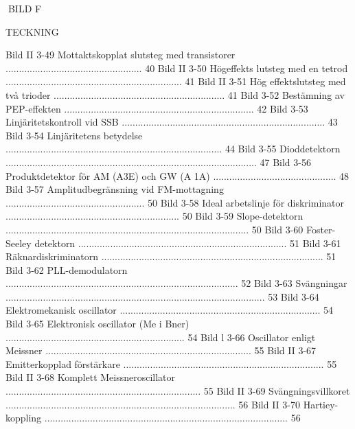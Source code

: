 \documentclass[a4paper,twoside,twocolumn,openright]{book}
\begin{document}
{{{{{{{{{{{BILD F

TECKNING

Bild II 3-49 Mottaktskopplat slutsteg med transistorer ................................................... 40
Bild II 3-50 Högeffekts lutsteg med en tetrod .................................................................. 41
Bild II 3-51 Hög effektslutsteg med två trioder ................................................................ 41
Bild 3-52 Bestämning av PEP-effekten ....................................................................... 42
Bild 3-53 Linjäritetskontroll vid SSB ............................................................................ 43
Bild 3-54 Linjäritetens betydelse ................................................................................. 44
Bild 3-55 Dioddetektorn .............................................................................................. 47
Bild 3-56 Produktdetektor för AM (A3E) och GW (A 1A) .............................................. 48
Bild 3-57 Amplitudbegränsning vid FM-mottagning .................................................... 50
Bild 3-58 Ideal arbetslinje för diskriminator ................................................................. 50
Bild 3-59 Slope-detektorn ........................................................................................... 50
Bild 3-60 Foster-Seeley detektorn .............................................................................. 51
Bild 3-61 Räknardiskriminatorn ................................................................................... 51
Bild 3-62 PLL-demodulatorn ....................................................................................... 52
Bild 3-63 Svängningar ................................................................................................. 53
Bild 3-64 Elektromekanisk oscillator ........................................................................... 54
Bild 3-65 Elektronisk oscillator (Me i Bner) ................................................................... 54
Bild l 3-66 Oscillator enligt Meissner ............................................................................. 55
Bild II 3-67 Emitterkopplad förstärkare ........................................................................... 55
Bild II 3-68 Komplett Meissneroscillator ......................................................................... 55
Bild II 3-69 Svängningsvillkoret ...................................................................................... 56
Bild II 3-70 Hartiey-koppling ........................................................................................... 56
}}}}}}}}}}}
\end{document}
